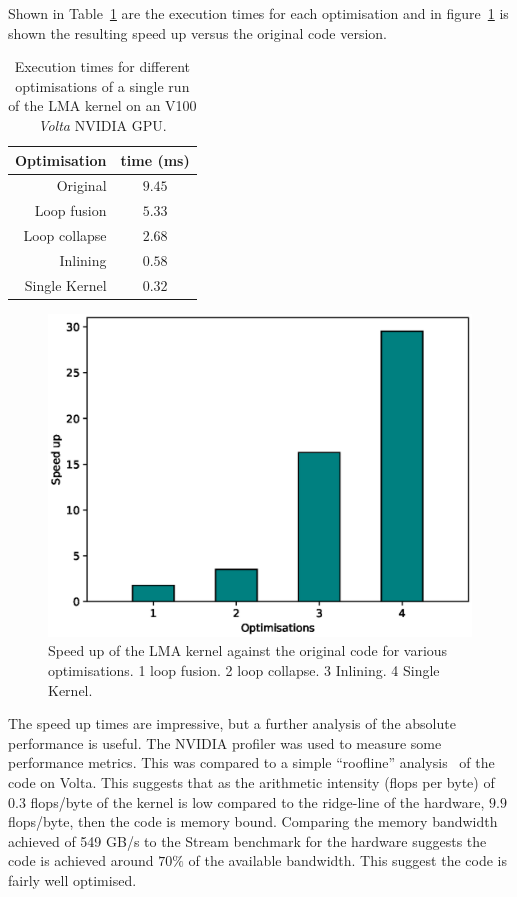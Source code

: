 Shown in Table~\ref{tab:lma_nvidia} are the execution times for each
optimisation and in figure~\ref{fig:lma_nvidia} is shown the resulting
speed up versus the original code version.

\begin{table}
\centering
\caption{\label{tab:lma_nvidia} Execution times for different
  optimisations of a single run of  the LMA kernel on an V100 
  {\em Volta} NVIDIA GPU.}
\begin{tabular}{rc}
Optimisation & time (ms) \\\hline
Original     & $9.45$ \\
Loop fusion  & $5.33$ \\
Loop collapse & $2.68$ \\ 
Inlining      & $0.58$ \\
Single Kernel & $0.32$ \\\hline
\end{tabular}
\end{table}

\begin{figure}
\centering\includegraphics[width=1.0\linewidth]{figs/LMA-nvidia.eps}
\caption{\label{fig:lma_nvidia}Speed up of the LMA kernel against the
  original code for various optimisations. 1 loop fusion. 2 loop
  collapse. 3 Inlining. 4 Single Kernel.}
\end{figure} 

The speed up times are impressive, but a further analysis of the
absolute performance is useful. The NVIDIA profiler was
used to measure some performance metrics. This was compared to a simple ``roofline''
analysis~\cite{roofline} of the code on Volta. This suggests that as the arithmetic
intensity (flops per byte) of $0.3$ flops/byte of the kernel is low
compared to the ridge-line of the hardware, $9.9$ flops/byte, then the
code is memory bound. Comparing the memory bandwidth achieved of 549
GB/s to the Stream benchmark for the hardware suggests the code is
achieved around $70\%$ of the available bandwidth. This suggest the
code is fairly well optimised.

